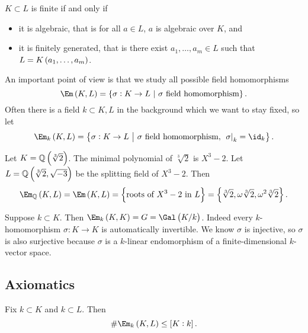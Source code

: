 \begin{remark*}
$ K \subset L $ is finite if and only if
\begin{itemize}
\item it is algebraic, that is for all $ a \in L $, $ a $ is algebraic over $ K $, and
\item it is finitely generated, that is there exist $ a_1, \dots, a_m \in L $ such that $ L = K\br{a_1, \dots, a_m} $.
\end{itemize}
\end{remark*}

An important point of view is that we study all possible field homomorphisms
$$ \Em\br{K, L} = \cbr{\sigma : K \to L \st \sigma \ \text{field homomorphism}}. $$
Often there is a field $ k \subset K, L $ in the background which we want to stay fixed, so let
$$ \Em_k\br{K, L} = \cbr{\sigma : K \to L \st \sigma \ \text{field homomorphism}, \ \eval{\sigma}_k = \id_k}. $$

\begin{example*}
Let $ K = \QQ\br{\sqrt[3]{2}} $. The minimal polynomial of $ \sqrt[3]{2} $ is $ X^3 - 2 $. Let $ L = \QQ\br{\sqrt[3]{2}, \sqrt{-3}} $ be the splitting field of $ X^3 - 2 $. Then
$$ \Em_\QQ\br{K, L} = \Em\br{K, L} = \cbr{\text{roots of} \ X^3 - 2 \ \text{in} \ L} = \cbr{\sqrt[3]{2}, \omega\sqrt[3]{2}, \omega^2\sqrt[3]{2}}. $$
\end{example*}

\begin{remark*}
Suppose $ k \subset K $. Then $ \Em_k\br{K, K} = G = \Gal\br{K / k} $. Indeed every $ k $-homomorphism $ \sigma : K \to K $ is automatically invertible. We know $ \sigma $ is injective, so $ \sigma $ is also surjective because $ \sigma $ is a $ k $-linear endomorphism of a finite-dimensional $ k $-vector space.
\end{remark*}

\pagebreak

\subsection{Axiomatics}

\begin{proposition}
\label{prop:1}
Fix $ k \subset K $ and $ k \subset L $. Then
$$ \#\Em_k\br{K, L} \le \sbr{K : k}. $$
\end{proposition}

